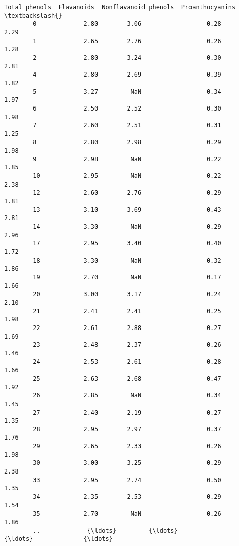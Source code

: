 \documentclass[11pt]{article}
\begin{document}
\begin{Verbatim}[commandchars=\\\{\}]
             Total phenols  Flavanoids  Nonflavanoid phenols  Proanthocyanins  \textbackslash{}
        0             2.80        3.06                  0.28             2.29   
        1             2.65        2.76                  0.26             1.28   
        2             2.80        3.24                  0.30             2.81   
        4             2.80        2.69                  0.39             1.82   
        5             3.27         NaN                  0.34             1.97   
        6             2.50        2.52                  0.30             1.98   
        7             2.60        2.51                  0.31             1.25   
        8             2.80        2.98                  0.29             1.98   
        9             2.98         NaN                  0.22             1.85   
        10            2.95         NaN                  0.22             2.38   
        12            2.60        2.76                  0.29             1.81   
        13            3.10        3.69                  0.43             2.81   
        14            3.30         NaN                  0.29             2.96   
        17            2.95        3.40                  0.40             1.72   
        18            3.30         NaN                  0.32             1.86   
        19            2.70         NaN                  0.17             1.66   
        20            3.00        3.17                  0.24             2.10   
        21            2.41        2.41                  0.25             1.98   
        22            2.61        2.88                  0.27             1.69   
        23            2.48        2.37                  0.26             1.46   
        24            2.53        2.61                  0.28             1.66   
        25            2.63        2.68                  0.47             1.92   
        26            2.85         NaN                  0.34             1.45   
        27            2.40        2.19                  0.27             1.35   
        28            2.95        2.97                  0.37             1.76   
        29            2.65        2.33                  0.26             1.98   
        30            3.00        3.25                  0.29             2.38   
        33            2.95        2.74                  0.50             1.35   
        34            2.35        2.53                  0.29             1.54   
        35            2.70         NaN                  0.26             1.86   
        ..             {\ldots}         {\ldots}                   {\ldots}              {\ldots}   

\end{Verbatim}
\end{document}
